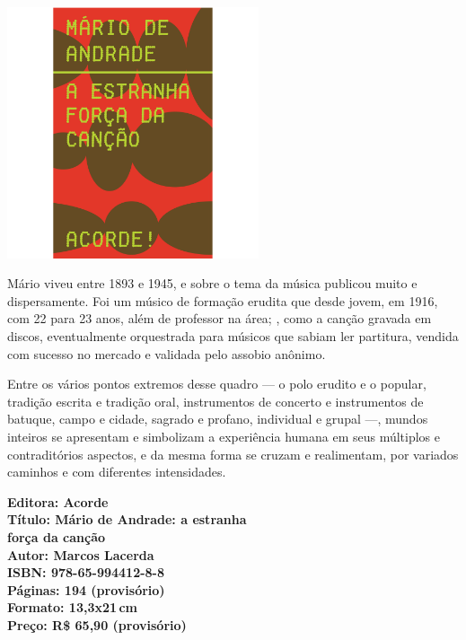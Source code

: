 \begin{center}
\hspace*{-3.6cm}
\hspace*{3.1cm}\includegraphics[width=74mm]{./CAPAS/ACORDE_MARIO.jpg}
\end{center}
\hspace*{-7cm}\hrulefill\hspace*{-7cm}
\medskip

\noindent{}Mário viveu entre 1893 e 1945, e sobre o tema da música publicou muito e dispersamente. Foi um músico de formação erudita que desde jovem, em 1916, com 22 para 23 anos, além de professor na área; , como a canção gravada em discos, eventualmente orquestrada para músicos que sabiam ler partitura, vendida com sucesso no mercado e validada pelo assobio anônimo. 

Entre os vários pontos extremos desse quadro --- o polo erudito e o popular, tradição escrita e tradição oral, instrumentos de concerto e instrumentos de batuque, campo e cidade, sagrado e profano, individual e grupal ---, mundos inteiros se apresentam e simbolizam a experiência humana em seus múltiplos e contraditórios aspectos, e da mesma forma se cruzam e realimentam, por variados caminhos e com diferentes intensidades.

\vfill
\hspace*{-.4cm}\begin{minipage}[c]{.5\linewidth}
\small\textbf{
\hspace*{-.1cm}Editora: Acorde\\
Título: Mário de Andrade: a estranha\\força da canção\\
Autor: Marcos Lacerda\\ 
ISBN: 978-65-994412-8-8\\
Páginas: 194 (provisório)\\
Formato: 13,3x21\,cm\\
Preço: R\$ 65,90 (provisório)\\
}
\end{minipage}

